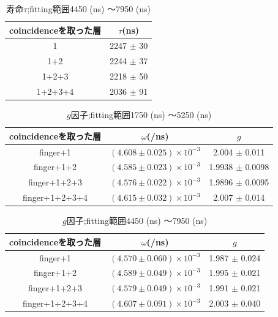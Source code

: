 \begin{table}[H]
\caption{寿命$\tau$;fitting範囲4450 (ns) 〜7950 (ns)}
\label{fitrange2}
\begin{center}
\begin{tabular}{cc}\toprule
coincidenceを取った層 	& $\tau$(ns) \\ \midrule
1 			& 2247 $\pm$ 30 \\
1+2 			& 2244 $\pm$ 37 \\
1+2+3 			& 2218 $\pm$ 50 \\
1+2+3+4 		& 2036 $\pm$ 91 \\ \bottomrule
\end{tabular}
\end{center}
\end{table}%

\begin{table}[H]
\caption{$g$因子;fitting範囲1750 (ns) 〜5250 (ns)}
\label{fitrange3}
\begin{center}
\begin{tabular}{ccc}\toprule
coincidenceを取った層 	& $\omega$(/ns) 			& $g$ \\ \midrule
finger+1 		& $( 4.608 \pm 0.025 ) \times 10^{-3}$ 	& 2.004  $\pm$ 0.011 \\
finger+1+2 		& $( 4.585 \pm 0.023 ) \times 10^{-3}$ 	& 1.9938 $\pm$ 0.0098 \\
finger+1+2+3 		& $( 4.576 \pm 0.022 ) \times 10^{-3}$ 	& 1.9896 $\pm$ 0.0095 \\
finger+1+2+3+4 		& $( 4.615 \pm 0.032 ) \times 10^{-3}$ 	& 2.007  $\pm$ 0.014 \\ \bottomrule
\end{tabular}
\end{center}
\end{table}%

\begin{table}[H]
\caption{$g$因子;fitting範囲4450 (ns) 〜7950 (ns)}
\label{fitrange4}
\begin{center}
\begin{tabular}{ccc}\toprule
coincidenceを取った層 	& $\omega$(/ns) 			& $g$ \\ \midrule
finger+1 		& $( 4.570 \pm 0.060 ) \times 10^{-3}$ 	& 1.987 $\pm$ 0.024 \\
finger+1+2 		& $( 4.589 \pm 0.049 ) \times 10^{-3}$ 	& 1.995 $\pm$ 0.021 \\
finger+1+2+3 		& $( 4.579 \pm 0.049 ) \times 10^{-3}$ 	& 1.991 $\pm$ 0.021 \\
finger+1+2+3+4 		& $( 4.607 \pm 0.091 ) \times 10^{-3}$ 	& 2.003 $\pm$ 0.040 \\ \bottomrule
\end{tabular}
\end{center}
\end{table}%


